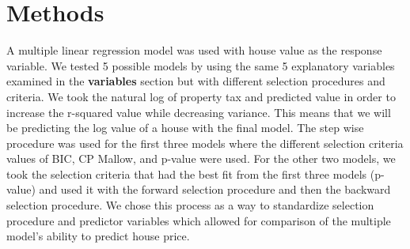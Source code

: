 \section{Methods}
\label{sec:methods}


A multiple linear regression model was used with house value as the response variable. We tested 5 possible models by using the same 5 explanatory variables examined in the \textbf{variables} section but with different selection procedures and criteria. We took the natural log of property tax and predicted value in order to increase the r-squared value while decreasing variance. This means that we will be predicting the log value of a house with the final model. The step wise procedure was used for the first three models where the different selection criteria values of BIC, CP Mallow, and p-value were used. For the other two models, we took the selection criteria that had the best fit from the first three models (p-value) and used it with the forward selection procedure and then the backward selection procedure. We chose this process as a way to standardize selection procedure and predictor variables which allowed for comparison of the multiple model's ability to predict house price. 


